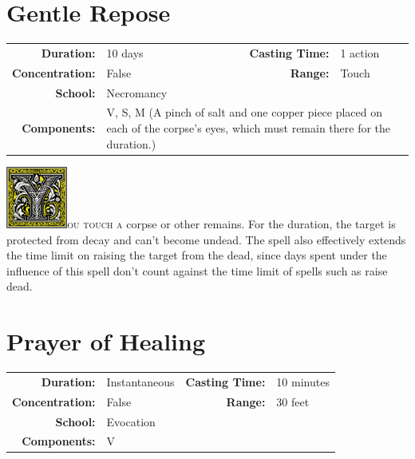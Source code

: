\documentclass[12pt,showtrims]{memoir}
\begin{document}
\newpage
\section*{Gentle Repose}

{
\small\centering\vspace{-6pt}
\begin{tabular}{rlrl}
\toprule

\textbf{Duration:} & 10 days &
\textbf{Casting Time:} & 1 action \\
\textbf{Concentration:} & False &
\textbf{Range:} & Touch \\
\textbf{School:} & Necromancy \\
\textbf{Components:} & \multicolumn{3}{p{0.7\textwidth}}{V, S, M (A pinch of salt and one copper piece placed on each of the corpse's eyes, which must remain there for the duration.)}\\

\bottomrule
\end{tabular}
}

\vspace{1\baselineskip}\noindent 
\lettrine[lines=4]{\includegraphics[height=58pt]{initials/Y.png}}{ou touch a} corpse or other remains. For the duration, the target is protected from decay and can't become undead. The spell also effectively extends the time limit on raising the target from the dead, since days spent under the influence of this spell don't count against the time limit of spells such as raise dead.

\newpage
\section*{Prayer of Healing}

{
\small\centering\vspace{-6pt}
\begin{tabular}{rlrl}
\toprule

\textbf{Duration:} & Instantaneous &
\textbf{Casting Time:} & 10 minutes \\
\textbf{Concentration:} & False &
\textbf{Range:} & 30 feet \\
\textbf{School:} & Evocation \\
\textbf{Components:} & \multicolumn{3}{p{0.7\textwidth}}{V}\\

\bottomrule
\end{tabular}
}
\end{document}
